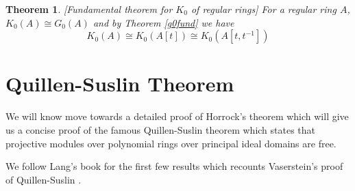 \documentclass[12pt]{report}
\numberwithin{equation}{section}
\newcounter{dummy} \numberwithin{dummy}{section}
\newtheorem{theorem}[dummy]{Theorem}
\newtheorem{definition}[dummy]{Definition}
\begin{document}
	\begin{theorem}\label{extensionk0iscong}[Fundamental theorem for $K_0$ of regular rings]
		For a regular ring $A$, $K_0(A)\cong G_0(A)$ and by Theorem \ref{g0fund} we have \[ K_0(A) \cong K_0(A[t]) \cong K_0(A[t,t^{-1}]) \]
	\end{theorem}

	
%	
	
	
	\chapter{Quillen-Suslin Theorem}
	We will know move towards a detailed proof of Horrock's theorem which will give us a concise proof of the famous Quillen-Suslin theorem which states that projective modules over polynomial rings over principal ideal domains are free. 
	
	We follow Lang's book for the first few results which recounts Vaserstein's proof of Quillen-Suslin \cite{lang02}.
	
\end{document}
